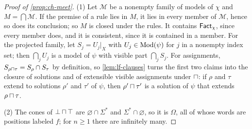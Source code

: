 \begin{proof}[Proof of \cref{prop:ch-meet}]
(1) Let $\mathcal M$ be a nonempty family of models of $\chi$ and
$M=\bigcap\mathcal M$. If the premise of a rule lies in $M$, it lies in every
member of $\mathcal M$, hence so does its conclusion; so $M$ is closed under
the rules. It contains $\mathsf{Fact}_\chi$, since every member does, and it is
consistent, since it is contained in a member. For the projected family, let
$S_j=U_j|_X$ with $U_j\in\operatorname{Mod}(\psi)$ for $j$ in a nonempty index set; then
$\bigcap_jU_j$ is a model of $\psi$ with visible part $\bigcap_jS_j$. For
assignments, $S_{\rho\sqcap\tau}=S_\rho\cap S_\tau$ by definition, so
\cref{lem:lf-clauses} turns the first two claims into the closure of
solutions and of extensible visible assignments under $\sqcap$: if $\rho$
and $\tau$ extend to solutions $\rho'$ and $\tau'$ of $\psi$, then
$\rho'\sqcap\tau'$ is a solution of $\psi$ that extends
$\rho\sqcap\tau$.

(2) The cones of $\bot\sqcap\top$ are $\varnothing\cap\Sigma^*$ and
$\Sigma^*\cap\varnothing$, so it is $\Omega$, all of whose words are positions
labeled $f$; for $n\ge1$ there are infinitely many.
\end{proof}
